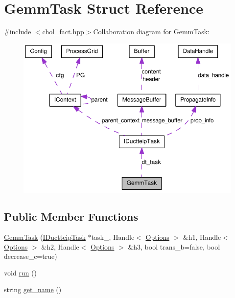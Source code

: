 \hypertarget{struct_gemm_task}{
\section{GemmTask Struct Reference}
\label{struct_gemm_task}
}


{\ttfamily \#include $<$chol\_\-fact.hpp$>$}Collaboration diagram for GemmTask:\nopagebreak
\begin{figure}[H]
\begin{center}
\leavevmode
\includegraphics[width=394pt]{struct_gemm_task__coll__graph}
\end{center}
\end{figure}
\subsection*{Public Member Functions}
\begin{DoxyCompactItemize}
\item 
\hyperlink{struct_gemm_task_a9cd60061ae88b345e70ece76d5a36b5a}{GemmTask} (\hyperlink{class_i_ductteip_task}{IDuctteipTask} $\ast$task\_\-, Handle$<$ \hyperlink{struct_options}{Options} $>$ \&h1, Handle$<$ \hyperlink{struct_options}{Options} $>$ \&h2, Handle$<$ \hyperlink{struct_options}{Options} $>$ \&h3, bool trans\_\-b=false, bool decrease\_\-c=true)
\item 
void \hyperlink{struct_gemm_task_a3b8ea26b6bf1116c292dc40b5f759386}{run} ()
\item 
string \hyperlink{struct_gemm_task_ac4724446924cdcf9cb5b2cbf9c01b4fd}{get\_\-name} ()
\end{DoxyCompactItemize}
